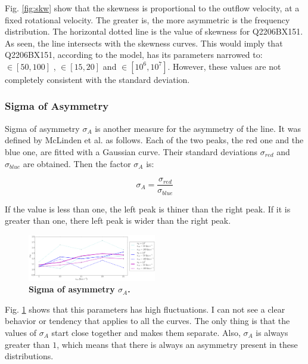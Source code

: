 \documentclass{latex/emulateapj}
\begin{document}
Fig. \ref{fig:skw} show that the skewness is proportional to the outflow velocity, at a fixed rotational velocity. The greater \vout is, the more asymmetric is the \lya frequency distribution. The horizontal dotted line is the value of skewness for Q2206BX151. As seen, the line intersects with the skewness curves. This would imply that Q2206BX151, according to the model, has its parameters narrowed to: \vrot $\in [50,100]$ \kms, \vout $\in [15,20]$ \kms and \tauh $\in [10^6, 10^7]$. However, these values are not completely consistent with the standard deviation.\\

\subsubsection{Sigma of Asymmetry}
Sigma of asymmetry $\sigma_A$ is another measure for the asymmetry of the \lya line. It was defined by McLinden et al. \cite{McLinden2011} as follows. Each of the two peaks, the red one and the blue one, are fitted with a Gaussian curve. Their standard deviations $\sigma_{red}$ and $\sigma_{blue}$ are obtained. Then the factor $\sigma_A$ is:

\begin{equation}
\sigma_A = \frac{\sigma_{red}}{\sigma_{blue}}
\end{equation}

If the value is less than one, the left peak is thiner than the right peak. If it is greater than one, there left peak is wider than the right peak.\\

\begin{figure}[h!]
	\begin{center}
		\includegraphics[width=0.5\textwidth]{./figures/sigma}
	\end{center}
	\caption{\textbf{Sigma of asymmetry $\sigma_A$.} 
		\label{fig:sigma}}
\end{figure}

Fig. \ref{fig:sigma} shows that this parameters has high fluctuations. I can not see a clear behavior or tendency that applies to all the curves. The only thing is that the values of $\sigma_A$ start close together and \vout makes them separate. Also, $\sigma_A$ is always greater than $1$, which means that there is always an asymmetry present in these distributions.\\ 
\end{document}
